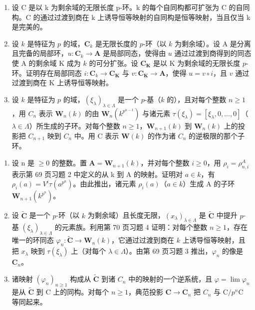 \begin{enumerate}
\def\labelenumi{\arabic{enumi})}
\setcounter{enumi}{7}
\item
  设 C 是以 k 为剩余域的无限长度 p-环。k 的每个自同构都可扩张为 C 的自同构。C 的通过过渡到商在 k 上诱导恒等映射的自同构是恒等映射，当且仅当 k 是完美的。
\item
  设 \(k\) 是特征为 \(p\) 的域，\(\mathbf{C}_k\) 是无限长度的 \(p\)-环（以 \(k\) 为剩余域）。设 A 是分离且完备的局部环，\(u: \mathbf{C}_k \to \mathbf{A}\) 是局部同态，使得由 \(u\) 通过过渡到商得到的同态使 A 的剩余域 K 成为 \(k\) 的可分扩张。设 \(\mathbf{C}_{\mathbf{K}}\) 是以 K 为剩余域的无限长度 \(p\)-环。证明存在局部同态 \(i: \mathbf{C}_k \to \mathbf{C}_{\mathbf{K}}\) 与 \(v: \mathbf{C}_{\mathbf{K}} \to \mathbf{A}\)，使得 \(u = v \circ i\)，且 \(v\) 通过过渡到商在 K 上诱导恒等映射。
\item
  设 \(k\) 是特征为 \(p\) 的域，\((\xi_{\lambda})_{\lambda \in \Lambda}\) 是一个 \(p\)-基（\(k\) 的），且对每个整数 \(n \geqslant 1\)，用 \(C_n\) 表示 \(\mathbf{W}_n(k)\) 的由 \(\mathbf{W}_n(k^{p^{n-1}})\) 与诸元素 \(\tau(\xi_{\lambda}) = [\xi_{\lambda}, 0, ..., 0]\)（\(\lambda \in \Lambda\)）所生成的子环。对每个整数 \(n \geqslant 1\)，\(\mathbf{W}_{n+1}(k)\) 到 \(\mathbf{W}_n(k)\) 上的投影把 \(C_{n+1}\) 映到 \(C_n\) 中。用 C 表示 \(\mathbf{W}(k)\) 的作为诸 \(C_n\) 的逆极限的那个子环。
\end{enumerate}

\begin{enumerate}
\def\labelenumi{\alph{enumi})}
\item
  设 n 是 \(\geqslant 0\) 的整数。置 \(\mathbf{A} = \mathbf{W}_{n+1}(k)\)，并对每个整数 \(i \geqslant 0\)，用 \(\rho_{i} = \rho_{n,i}^{A}\) 表示第 69 页习题 2 中定义的从 k 到 A 的映射。证明对 \(a \in k\)，有 \(\rho_{i}(a) = V^{i}\tau(a^{p^{n}})\)。由此推出，诸元素 \(\rho_{i}(a)\)（\(a \in k\)）生成 A 的子环 \(\mathbf{W}_{n+1}(k^{p^{n}})\)。
\item
  设 \(\tilde{\mathbf{C}}\) 是一个 \(p\)-环（以 \(k\) 为剩余域）且长度无限，\((x_{\lambda})_{\lambda \in \Lambda}\) 是 \(\tilde{\mathbf{C}}\) 中提升 \(p\)-基 \((\xi_{\lambda})_{\lambda \in \Lambda}\) 的元素族。利用第 70 页习题 4 证明：对每个整数 \(n \geqslant 1\)，存在唯一的环同态 \(\varphi_n: \tilde{\mathbf{C}} \to \mathbf{W}_n(k)\)，它通过过渡到商在 \(k\) 上诱导恒等映射，且把 \(x_{\lambda}\) 映到 \(\tau(\xi_{\lambda})\) 上（对每个 \(\lambda \in \Lambda\)）。由第 69 页习题 3 推出，\(\varphi_n\) 的像是 \(\mathbf{C}_n\)。
\item
  诸映射 \((\varphi_n)_{n\geqslant 1}\) 构成从 \(\tilde{\mathbf{C}}\) 到诸 \(C_n\) 中的映射的一个逆系统，且 \(\varphi = \lim \varphi_n\) 是从 \(\tilde{\mathbf{C}}\) 到 C 上的同构。对每个 \(n\geqslant 1\)，典范投影 \(\mathbf{C}\to \mathbf{C}_n\) 把 \(C_n\) 与 \(\mathrm{C} / p^n\mathrm{C}\) 等同起来。
\end{enumerate}

